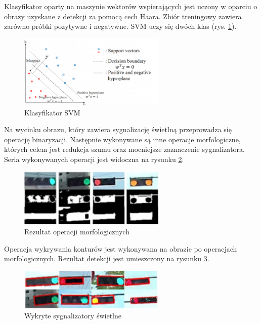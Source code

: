 Klasyfikator oparty na maszynie wektorów wspierających jest uczony w oparciu o obrazy uzyskane z detekcji za pomocą cech Haara. 
Zbiór treningowy zawiera zarówno próbki pozytywne i negatywne. 
SVM uczy się dwóch klas (rys. \ref{fig:traffic_light2_svm}).

\begin{figure}
  \centering
  \includegraphics[width=7cm]{img/traffic_light2_svm.png}
  \caption{Klasyfikator SVM\cite{T9}}
  \label{fig:traffic_light2_svm}
\end{figure}

Na wycinku obrazu, który zawiera sygnalizację świetlną przeprowadza się operację binaryzacji.
Następnie wykonywane są inne operacje morfologiczne, których celem jest redukcja szumu oraz mocniejsze zaznaczenie sygnalizatora. 
Seria wykonywanych operacji jest widoczna na rysunku \ref{fig:traffic_light2_morph}.

\begin{figure}
  \centering
  \includegraphics[width=7cm]{img/traffic_light2_morph.png}
  \caption{Rezultat operacji morfologicznych\cite{T9}}
  \label{fig:traffic_light2_morph}
\end{figure}

Operacja wykrywania konturów jest wykonywana na obrazie po operacjach morfologicznych. 
Rezultat detekcji jest umieszczony na rysunku \ref{fig:traffic_light2_result}.

\begin{figure}
  \centering
  \includegraphics[width=7cm]{img/traffic_light2_results.png}
  \caption{Wykryte sygnalizatory świetlne\cite{T9}}
  \label{fig:traffic_light2_result}
\end{figure}

